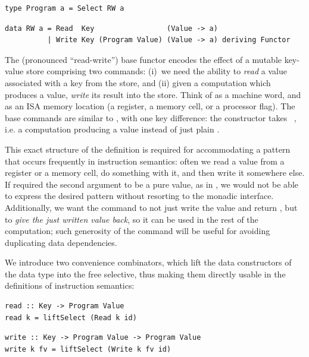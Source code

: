 \vspace{1mm}
\begin{verbatim}
type Program a = Select RW a
\end{verbatim}
\vspace{-0.5mm}
\begin{verbatim}
data RW a = Read  Key                 (Value -> a)
          | Write Key (Program Value) (Value -> a) deriving Functor
\end{verbatim}
\vspace{1mm}

\noindent
The  (pronounced ``read-write'') base functor encodes the effect of a
mutable key-value store comprising two commands: (i)~we need the ability to
\emph{read} a value associated with a key from the store, and (ii) given a
computation which produces a value, \emph{write} its result into the store.
Think of  as a machine word, and  as an ISA memory location
(a register, a memory cell, or a processor flag). The base commands are similar
to , with one key difference: the  constructor takes
~, i.e. a computation producing a value instead of just
plain .

This exact structure of the definition is required for accommodating a pattern
that occurs frequently in instruction semantics: often we read a value from a
register or a memory cell, do something with it, and then write it somewhere
else. If  required the second argument to be a pure value, as in
, we would not be able to express the desired pattern without
resorting to the monadic interface. Additionally, we want the 
command to not just write the value and return \hs{()}, but to \emph{give the
just written value back}, so it can be used in the rest of the computation; such
generosity of the  command will be useful for avoiding duplicating
data dependencies.

We introduce two convenience combinators, which lift the data constructors of
the  data type into the free selective, thus making them directly usable
in the definitions of instruction semantics:

\vspace{1mm}
\begin{verbatim}
read :: Key -> Program Value
read k = liftSelect (Read k id)
\end{verbatim}
\vspace{-0.5mm}
\begin{verbatim}
write :: Key -> Program Value -> Program Value
write k fv = liftSelect (Write k fv id)
\end{verbatim}
\vspace{1mm}

